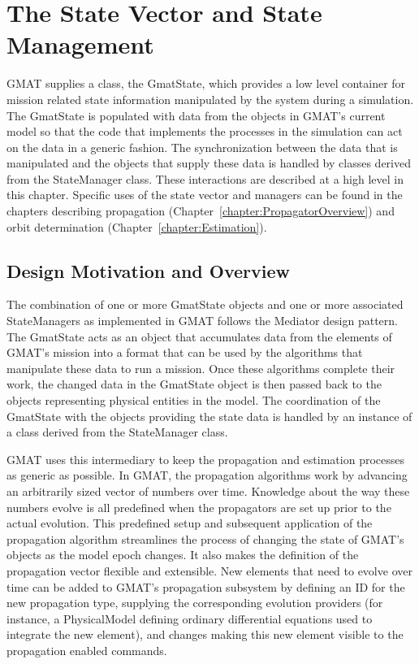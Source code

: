 \chapter{\label{chapter:PropagatorStates}The State Vector and State Management}

GMAT supplies a class, the GmatState, which provides a low level container for mission related
state information manipulated by the system during a simulation.  The GmatState is populated with
data from the objects in GMAT's current model so that the code that implements the processes in the
simulation can act on the data in a generic fashion.  The synchronization between the data that
is manipulated and the objects that supply these data is handled by classes derived from the
StateManager class.  These interactions are described at a high level in this chapter.  Specific
uses of the state vector and managers can be found in the chapters describing propagation
(Chapter~\ref{chapter:PropagatorOverview}) and orbit determination
(Chapter~\ref{chapter:Estimation}).

\section{Design Motivation and Overview}

The combination of one or more GmatState objects and one or more associated StateManagers as
implemented in GMAT follows the Mediator design pattern.  The GmatState acts as an object
that accumulates data from the elements of GMAT's mission into a format that can be used by the
algorithms that manipulate these data to run a mission.  Once these algorithms complete their work,
the changed data in the GmatState object is then passed back to the objects representing physical
entities in the model.  The coordination of the GmatState with the objects providing the state data
is handled by an instance of a class derived from the StateManager class.

GMAT uses this intermediary to keep the propagation and estimation processes as generic as
possible.  In GMAT, the propagation algorithms work by advancing an arbitrarily sized vector of
numbers over time.  Knowledge about the way these numbers evolve is all predefined when the
propagators are set up prior to the actual evolution.  This predefined setup and subsequent
application of the propagation algorithm streamlines the process of changing the state of GMAT's
objects as the model epoch changes.  It also makes the definition of the propagation vector
flexible and extensible.  New elements that need to evolve over time can be added to GMAT's
propagation subsystem by defining an ID for the new propagation type, supplying the corresponding
evolution providers (for instance, a PhysicalModel defining ordinary differential equations used
to integrate the new element), and changes making this new element visible to the propagation
enabled commands.

